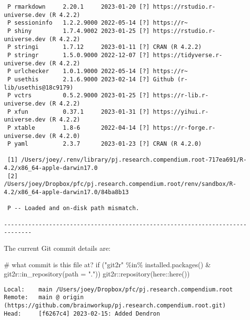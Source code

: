 \documentclass[
  super,
  preprint,
  3p]{elsarticle}
\newenvironment{Shaded}{\begin{snugshade}}{\end{snugshade}}
\newcommand{\AttributeTok}[1]{\textcolor[rgb]{0.40,0.45,0.13}{#1}}
\newcommand{\CommentTok}[1]{\textcolor[rgb]{0.37,0.37,0.37}{#1}}
\newcommand{\ControlFlowTok}[1]{\textcolor[rgb]{0.00,0.23,0.31}{#1}}
\newcommand{\FunctionTok}[1]{\textcolor[rgb]{0.28,0.35,0.67}{#1}}
\newcommand{\NormalTok}[1]{\textcolor[rgb]{0.00,0.23,0.31}{#1}}
\newcommand{\SpecialCharTok}[1]{\textcolor[rgb]{0.37,0.37,0.37}{#1}}
\newcommand{\StringTok}[1]{\textcolor[rgb]{0.13,0.47,0.30}{#1}}
\begin{document}
\begin{verbatim}
 P rmarkdown     2.20.1     2023-01-20 [?] https://rstudio.r-universe.dev (R 4.2.2)
 P sessioninfo   1.2.2.9000 2022-05-14 [?] https://r~
 P shiny         1.7.4.9002 2023-01-25 [?] https://rstudio.r-universe.dev (R 4.2.2)
 P stringi       1.7.12     2023-01-11 [?] CRAN (R 4.2.2)
 P stringr       1.5.0.9000 2022-12-07 [?] https://tidyverse.r-universe.dev (R 4.2.2)
 P urlchecker    1.0.1.9000 2022-05-14 [?] https://r~
 P usethis       2.1.6.9000 2023-02-14 [?] Github (r-lib/usethis@18c9179)
 P vctrs         0.5.2.9000 2023-01-25 [?] https://r-lib.r-universe.dev (R 4.2.2)
 P xfun          0.37.1     2023-01-31 [?] https://yihui.r-universe.dev (R 4.2.2)
 P xtable        1.8-6      2022-04-14 [?] https://r-forge.r-universe.dev (R 4.2.0)
 P yaml          2.3.7      2023-01-23 [?] CRAN (R 4.2.0)

 [1] /Users/joey/.renv/library/pj.research.compendium.root-717ea691/R-4.2/x86_64-apple-darwin17.0
 [2] /Users/joey/Dropbox/pfc/pj.research.compendium.root/renv/sandbox/R-4.2/x86_64-apple-darwin17.0/84ba8b13

 P -- Loaded and on-disk path mismatch.

------------------------------------------------------------------------------
\end{verbatim}

The current Git commit details are:

\begin{Shaded}
\begin{Highlighting}[]
\CommentTok{\# what commit is this file at? }
\ControlFlowTok{if}\NormalTok{ (}\StringTok{"git2r"} \SpecialCharTok{\%in\%} \FunctionTok{installed.packages}\NormalTok{() }\SpecialCharTok{\&}\NormalTok{ git2r}\SpecialCharTok{::}\FunctionTok{in\_repository}\NormalTok{(}\AttributeTok{path =} \StringTok{"."}\NormalTok{)) git2r}\SpecialCharTok{::}\FunctionTok{repository}\NormalTok{(here}\SpecialCharTok{::}\FunctionTok{here}\NormalTok{())  }
\end{Highlighting}
\end{Shaded}

\begin{verbatim}
Local:    main /Users/joey/Dropbox/pfc/pj.research.compendium.root
Remote:   main @ origin (https://github.com/brainworkup/pj.research.compendium.root.git)
Head:     [f6267c4] 2023-02-15: Added Dendron
\end{verbatim}


  
\end{document}
